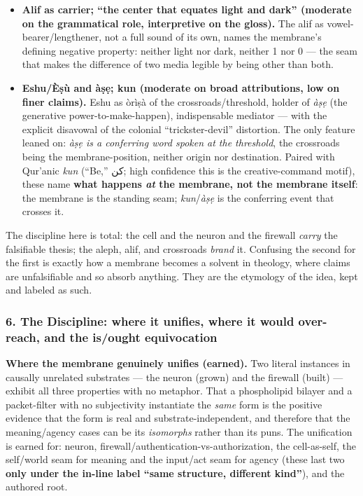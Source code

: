 \documentclass[11pt]{article}
\newcommand{\AR}[1]{{\arabicfont\beginR #1\endR}}
\begin{document}
\begin{itemize}
\item \textbf{Alif as carrier; ``the center that equates light and dark'' (moderate on the grammatical role, interpretive on the gloss).} The alif as vowel-bearer/\allowbreak{}lengthener, not a full sound of its own, names the membrane's defining negative property: neither light nor dark, neither 1 nor 0 — the seam that makes the difference of two media legible by being other than both.
\end{itemize}

\begin{itemize}
\item \textbf{Eshu/\allowbreak{}Èṣù and àṣẹ; kun (moderate on broad attributions, low on finer claims).} Eshu as òrìṣà of the crossroads/\allowbreak{}threshold, holder of \emph{àṣẹ} (the generative power-to-make-happen), indispensable mediator — with the explicit disavowal of the colonial ``trickster-devil'' distortion. The only feature leaned on: \emph{àṣẹ is a conferring word spoken at the threshold}, the crossroads being the membrane-position, neither origin nor destination. Paired with Qur'anic \emph{kun} (``Be,'' \AR{كن}; high confidence this is the creative-command motif), these name \textbf{what happens \emph{at} the membrane, not the membrane itself}: the membrane is the standing seam; \emph{kun}/\allowbreak{}\emph{àṣẹ} is the conferring event that crosses it.
\end{itemize}

The discipline here is total: the cell and the neuron and the firewall \emph{carry} the falsifiable thesis; the aleph, alif, and crossroads \emph{brand} it. Confusing the second for the first is exactly how a membrane becomes a solvent in theology, where claims are unfalsifiable and so absorb anything. They are the etymology of the idea, kept and labeled as such.

\subsubsection*{6. The Discipline: where it unifies, where it would over-reach, and the is/\allowbreak{}ought equivocation}

\textbf{Where the membrane genuinely unifies (earned).} Two literal instances in causally unrelated substrates — the neuron (grown) and the firewall (built) — exhibit all three properties with no metaphor. That a phospholipid bilayer and a packet-filter with no subjectivity instantiate the \emph{same} form is the positive evidence that the form is real and substrate-independent, and therefore that the meaning/\allowbreak{}agency cases can be its \emph{isomorphs} rather than its puns. The unification is earned for: neuron, firewall/\allowbreak{}authentication-vs-authorization, the cell-as-self, the self/\allowbreak{}world seam for meaning and the input/\allowbreak{}act seam for agency (these last two \textbf{only under the in-line label ``same structure, different kind''}), and the authored root.
\end{document}
